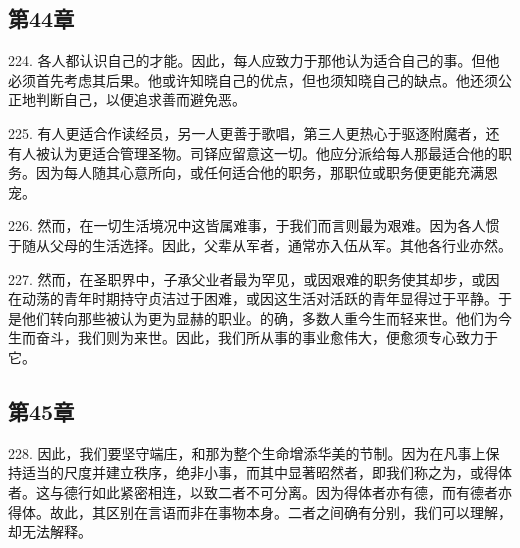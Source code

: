 
\subsection{第44章}

\par

224. 各人都认识自己的才能。因此，每人应致力于那他认为适合自己的事。但他必须首先考虑其后果。他或许知晓自己的优点，但也须知晓自己的缺点。他还须公正地判断自己，以便追求善而避免恶。\par

225. 有人更适合作读经员，另一人更善于歌唱，第三人更热心于驱逐附魔者，还有人被认为更适合管理圣物。司铎应留意这一切。他应分派给每人那最适合他的职务。因为每人随其心意所向，或任何适合他的职务，那职位或职务便更能充满恩宠。\par

226. 然而，在一切生活境况中这皆属难事，于我们而言则最为艰难。因为各人惯于随从父母的生活选择。因此，父辈从军者，通常亦入伍从军。其他各行业亦然。\par

227. 然而，在圣职界中，子承父业者最为罕见，或因艰难的职务使其却步，或因在动荡的青年时期持守贞洁过于困难，或因这生活对活跃的青年显得过于平静。于是他们转向那些被认为更为显赫的职业。的确，多数人重今生而轻来世。他们为今生而奋斗，我们则为来世。因此，我们所从事的事业愈伟大，便愈须专心致力于它。\par


\subsection{第45章}

\par

228. 因此，我们要坚守端庄，和那为整个生命增添华美的节制。因为在凡事上保持适当的尺度并建立秩序，绝非小事，而其中显著昭然者，即我们称之为，或得体者。这与德行如此紧密相连，以致二者不可分离。因为得体者亦有德，而有德者亦得体。故此，其区别在言语而非在事物本身。二者之间确有分别，我们可以理解，却无法解释。\par

